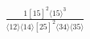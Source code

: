 \documentclass[varwidth, border=5pt]{standalone}
\begin{document}
\begin{my}
$\begin{gathered}
\scriptscriptstyle\frac{1[15]^2⟨15⟩^3}{⟨12⟩⟨14⟩[25]^2⟨34⟩⟨35⟩}
\end{gathered}$
\end{my}
\end{document}
